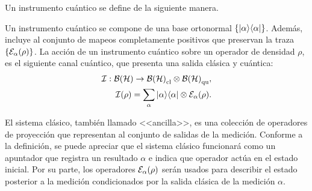 Un instrumento cuántico se define de la siguiente manera.\begin{definition} Un instrumento cuántico se compone  de una base ortonormal $\{|\alpha\rangle \langle \alpha |\}$. Además, incluye al conjunto de mapeos completamente positivos que preservan la traza $\{\mathcal{E}_\alpha(\rho)\}$. La acción de un instrumento cuántico sobre un operador de densidad $\rho$, es el siguiente canal cuántico, que presenta una salida clásica y cuántica:\begin{equation}
    \begin{split}
        \mathcal{I}: \mathcal{B(H)}\rightarrow\mathcal{B(H)}_{\text{cl}}\otimes \mathcal{B(H)}_{\text{qu}},\\
    \mathcal{I}(\rho)=\sum_\alpha |\alpha\rangle \langle\alpha|\otimes \mathcal{E}_\alpha(\rho).
    \end{split}
\end{equation}
\end{definition}
El sistema clásico, también llamado <<ancilla>>, es una colección de operadores de proyección que representan al conjunto de salidas de la medición. Conforme a la definición, se puede apreciar que el sistema clásico funcionará como un apuntador que registra un resultado $\alpha$ e indica que operador actúa en el estado inicial. Por su parte, los operadores $\mathcal{E}_\alpha(\rho)$ serán usados para describir  el estado posterior a la medición condicionados por la salida clásica de la medición $\alpha$.






